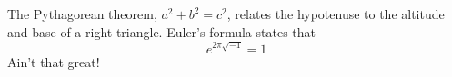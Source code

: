The Pythagorean theorem, \(a^2 + b^2 = c^2\),
relates the hypotenuse to the altitude
and base of a right triangle.
Euler’s formula states that
\[
e^{2\pi \sqrt{-1}} = 1
\]
Ain’t that great!
